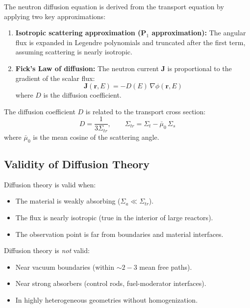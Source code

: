 \documentclass[12pt,a4paper]{article}
\begin{document}
The neutron diffusion equation is derived from the transport equation by
applying two key approximations:

\begin{enumerate}
  \item \textbf{Isotropic scattering approximation (P$_1$ approximation):}
        The angular flux is expanded in Legendre polynomials and truncated
        after the first term, assuming scattering is nearly isotropic.
  \item \textbf{Fick's Law of diffusion:} The neutron current $\mathbf{J}$
        is proportional to the gradient of the scalar flux:
        \begin{equation}
          \mathbf{J}(\mathbf{r}, E) = -D(E)\,\nabla\phi(\mathbf{r}, E)
          \label{eq:ficks}
        \end{equation}
        where $D$ is the diffusion coefficient.
\end{enumerate}

The diffusion coefficient $D$ is related to the transport cross section:
\begin{equation}
  D = \frac{1}{3\Sigma_{tr}}, \qquad
  \Sigma_{tr} = \Sigma_t - \bar{\mu}_0\,\Sigma_s
  \label{eq:diffcoeff}
\end{equation}
where $\bar{\mu}_0$ is the mean cosine of the scattering angle.

\subsection{Validity of Diffusion Theory}

Diffusion theory is valid when:
\begin{itemize}
  \item The material is weakly absorbing ($\Sigma_a \ll \Sigma_{tr}$).
  \item The flux is nearly isotropic (true in the interior of large reactors).
  \item The observation point is far from boundaries and material interfaces.
\end{itemize}

Diffusion theory is \textit{not} valid:
\begin{itemize}
  \item Near vacuum boundaries (within $\sim 2-3$ mean free paths).
  \item Near strong absorbers (control rods, fuel-moderator interfaces).
  \item In highly heterogeneous geometries without homogenization.
\end{itemize}
\end{document}
